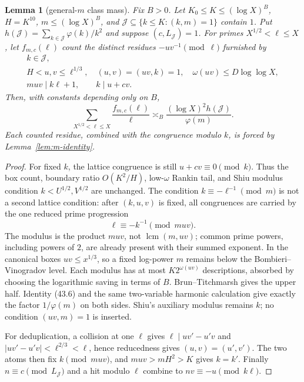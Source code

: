 \documentclass[10pt,reqno]{amsart}
\newtheorem{lemma}[theorem]{Lemma}
\theoremstyle{definition}
\newcommand{\lcm}{\operatorname {lcm}}
\newcommand{\1}{\mathbf 1}
\begin{document}
\begin{lemma}[general-$m$ class mass]\label{lem:m-class-mass}
Fix $B>0$.  Let $K_0\leq K\leq(\log X)^B$, $H=K^{10}$,
$m\leq(\log X)^B$, and
$\mathcal J\subseteq\{k\leq K:(k,m)=1\}$ contain $1$.  Put
$h(\mathcal J)=\sum_{k\in\mathcal J}\varphi(k)/k^2$ and suppose
$(c,L_{\mathcal J})=1$.  %
For primes $X^{1/2}<\ell\leq X$, let $f_{m,c}(\ell)$ count the distinct residues
$-uv^{-1}\pmod\ell$ furnished by
\begin{equation}\tag{43.7}
 \begin{gathered}
 k\in\mathcal J,\\ H<u,v\leq\ell^{1/3},\quad
 (u,v)=(uv,k)=1,\quad \omega(uv)\leq D\log\log X,\\
 muv\mid k\ell+1,
 \qquad k\mid u+cv.
 \end{gathered}
\end{equation}
Then, with constants depending only on $B$,
\begin{equation}\tag{43.8}
 \sum_{X^{1/2}<\ell\leq X}\frac{f_{m,c}(\ell)}\ell
 \asymp_B\frac{(\log X)^2h(\mathcal J)}{\varphi(m)}.
\end{equation}
Each counted residue, combined with the congruence modulo $k$, is forced by
Lemma~\ref{lem:m-identity}.
\end{lemma}
\begin{proof}
For fixed $k$, the lattice congruence is still $u+cv\equiv0\pmod k$.
Thus the box count, boundary ratio $O(K^2/H)$, low-$\omega$ Rankin tail,
and Shiu modulus condition $k<U^{1/2},V^{1/2}$ are unchanged.  The
condition $k\equiv-\ell^{-1}\pmod m$ is not a second lattice condition:
after $(k,u,v)$ is fixed, all congruences are carried by the one reduced
prime progression
\begin{equation}\tag{43.9}
 \ell\equiv-k^{-1}\pmod{muv}.
\end{equation}
The modulus is the product $muv$, not $\lcm(m,uv)$; common prime powers,
including powers of $2$, are already present with their summed exponent.
In the canonical boxes $uv\leq x^{1/3}$, so a fixed log-power $m$ remains
below the Bombieri--Vinogradov level.  Each modulus has at most
$K2^{\omega(uv)}$ descriptions, absorbed by choosing the logarithmic saving
in terms of $B$.  Brun--Titchmarsh gives the upper half.  Identity (43.6)
and the same two-variable harmonic calculation give exactly the factor
$1/\varphi(m)$ on both sides.  Shiu's auxiliary modulus remains $k$; no
condition $(uv,m)=1$ is inserted.

For deduplication, a collision at one $\ell$ gives
$\ell\mid uv'-u'v$ and $|uv'-u'v|<\ell^{2/3}<\ell$, hence reducedness gives
$(u,v)=(u',v')$.  The two atoms then fix $k\pmod{muv}$, and
$muv>mH^2>K$ gives $k=k'$.  Finally $n\equiv c\pmod{L_{\mathcal J}}$ and
a hit modulo $\ell$ combine to $nv\equiv-u\pmod{k\ell}$.
\end{proof}
\end{document}
